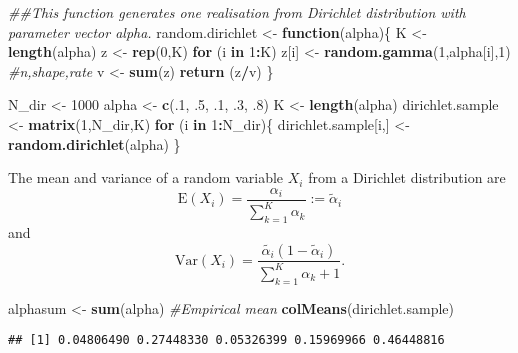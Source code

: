 \documentclass[]{article}
\newenvironment{Shaded}{\begin{snugshade}}{\end{snugshade}}
\newcommand{\CommentTok}[1]{\textcolor[rgb]{0.56,0.35,0.01}{\textit{#1}}}
\newcommand{\ControlFlowTok}[1]{\textcolor[rgb]{0.13,0.29,0.53}{\textbf{#1}}}
\newcommand{\DecValTok}[1]{\textcolor[rgb]{0.00,0.00,0.81}{#1}}
\newcommand{\FloatTok}[1]{\textcolor[rgb]{0.00,0.00,0.81}{#1}}
\newcommand{\KeywordTok}[1]{\textcolor[rgb]{0.13,0.29,0.53}{\textbf{#1}}}
\newcommand{\NormalTok}[1]{#1}
\newcommand{\OperatorTok}[1]{\textcolor[rgb]{0.81,0.36,0.00}{\textbf{#1}}}
\newcommand{\StringTok}[1]{\textcolor[rgb]{0.31,0.60,0.02}{#1}}
\begin{document}
\begin{Shaded}
\begin{Highlighting}[]
\CommentTok{##This function generates one realisation from Dirichlet distribution with parameter vector alpha.}
\NormalTok{random.dirichlet <-}\StringTok{ }\ControlFlowTok{function}\NormalTok{(alpha)\{}
\NormalTok{  K <-}\StringTok{ }\KeywordTok{length}\NormalTok{(alpha)}
\NormalTok{  z <-}\StringTok{ }\KeywordTok{rep}\NormalTok{(}\DecValTok{0}\NormalTok{,K)}
  \ControlFlowTok{for}\NormalTok{ (i }\ControlFlowTok{in} \DecValTok{1}\OperatorTok{:}\NormalTok{K)}
\NormalTok{    z[i] <-}\StringTok{ }\KeywordTok{random.gamma}\NormalTok{(}\DecValTok{1}\NormalTok{,alpha[i],}\DecValTok{1}\NormalTok{) }\CommentTok{#n,shape,rate}
\NormalTok{  v <-}\StringTok{ }\KeywordTok{sum}\NormalTok{(z)}
  \KeywordTok{return}\NormalTok{ (z}\OperatorTok{/}\NormalTok{v)}
\NormalTok{\}}

\NormalTok{N_dir <-}\StringTok{ }\DecValTok{1000}
\NormalTok{alpha <-}\StringTok{ }\KeywordTok{c}\NormalTok{(.}\DecValTok{1}\NormalTok{, }\FloatTok{.5}\NormalTok{, }\FloatTok{.1}\NormalTok{, }\FloatTok{.3}\NormalTok{, }\FloatTok{.8}\NormalTok{)}
\NormalTok{K <-}\StringTok{ }\KeywordTok{length}\NormalTok{(alpha)}
\NormalTok{dirichlet.sample <-}\StringTok{ }\KeywordTok{matrix}\NormalTok{(}\DecValTok{1}\NormalTok{,N_dir,K)}
\ControlFlowTok{for}\NormalTok{ (i }\ControlFlowTok{in} \DecValTok{1}\OperatorTok{:}\NormalTok{N_dir)\{}
\NormalTok{  dirichlet.sample[i,] <-}\StringTok{ }\KeywordTok{random.dirichlet}\NormalTok{(alpha)}
\NormalTok{\}}
\end{Highlighting}
\end{Shaded}

The mean and variance of a random variable \(X_i\) from a Dirichlet
distribution are \[
\text{E}(X_i) = \frac{\alpha_i}{\sum_{k=1}^K\alpha_k} := \tilde \alpha_i
\] and \[
\text{Var}(X_i)=\frac{\tilde{\alpha_i}(1-\tilde \alpha_i)}{\sum_{k=1}^K\alpha_k +1}.
\]

\begin{Shaded}
\begin{Highlighting}[]
\NormalTok{alphasum <-}\StringTok{ }\KeywordTok{sum}\NormalTok{(alpha)}
\CommentTok{#Empirical mean}
\KeywordTok{colMeans}\NormalTok{(dirichlet.sample)}
\end{Highlighting}
\end{Shaded}

\begin{verbatim}
## [1] 0.04806490 0.27448330 0.05326399 0.15969966 0.46448816
\end{verbatim}
\end{document}
